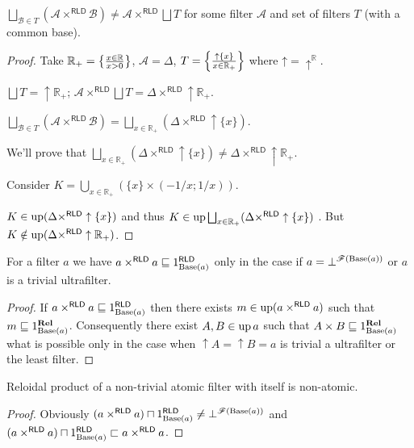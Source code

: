 \begin{example}
$\bigsqcup_{\mathcal{B}\in T}(\mathcal{A}\times^{\mathsf{RLD}}\mathcal{B})\ne\mathcal{A}\times^{\mathsf{RLD}}\bigsqcup T$
for some filter $\mathcal{A}$ and set of filters $T$ (with a common
base).\end{example}
\begin{proof}
Take $\mathbb{R}_{+}=\left\{ \frac{x\in\mathbb{R}}{x>0}\right\}$, $\mathcal{A}=\Delta$,
$T=\left\{ \frac{\uparrow\{x\}}{x\in\mathbb{R}_{+}}\right\}$ where $\mathord\uparrow=\mathord{\uparrow^{\mathbb{R}}}$.

$\bigsqcup T=\uparrow\mathbb{R}_{+}$; $\mathcal{A}\times^{\mathsf{RLD}}\bigsqcup T=\Delta\times^{\mathsf{RLD}}\uparrow\mathbb{R}_{+}$.

$\bigsqcup_{\mathcal{B}\in T}(\mathcal{A}\times^{\mathsf{RLD}}\mathcal{B})=\bigsqcup_{x\in\mathbb{R}_{+}}(\Delta\times^{\mathsf{RLD}}\uparrow\{x\})$.

We'll prove that $\bigsqcup_{x\in\mathbb{R}_{+}}(\Delta\times^{\mathsf{RLD}}\uparrow\{x\})\ne\Delta\times^{\mathsf{RLD}}\uparrow\mathbb{R}_{+}$.

Consider $K=\bigcup_{x\in\mathbb{R}_{+}}(\{x\}\times(-1/x;1/x))$.

$K\in\operatorname{up}(\Delta\times^{\mathsf{RLD}}\uparrow\{x\})$ and thus $K\in\operatorname{up}\bigsqcup_{x\in\mathbb{R}_{+}}(\Delta\times^{\mathsf{RLD}}\uparrow\{x\})$
. But $K\notin\operatorname{up}(\Delta\times^{\mathsf{RLD}}\uparrow\mathbb{R}_{+})$.\end{proof}
\begin{thm}
For a filter $a$ we have $a\times^{\mathsf{RLD}}a\sqsubseteq1_{\operatorname{Base}(a)}^{\mathsf{RLD}}$
only in the case if $a=\bot^{\mathscr{F}(\operatorname{Base}(a))}$ or $a$ is a
trivial ultrafilter.\end{thm}
\begin{proof}
If $a\times^{\mathsf{RLD}}a\sqsubseteq1_{\operatorname{Base}(a)}^{\mathsf{RLD}}$
then there exists $m\in\operatorname{up}(a\times^{\mathsf{RLD}}a)$ such that $m\sqsubseteq1_{\operatorname{Base}(a)}^{\mathbf{Rel}}$.
Consequently there exist $A,B\in\operatorname{up} a$ such that $A\times B\sqsubseteq1_{\operatorname{Base}(a)}^{\mathbf{Rel}}$
what is possible only in the case when $\uparrow A=\uparrow B=a$
is trivial a ultrafilter or the least filter.\end{proof}
\begin{cor}
Reloidal product of a non-trivial atomic filter with itself is non-atomic.\end{cor}
\begin{proof}
Obviously $(a\times^{\mathsf{RLD}}a)\sqcap1_{\operatorname{Base}(a)}^{\mathsf{RLD}}\ne\bot^{\mathscr{F}(\operatorname{Base}(a))}$
and $(a\times^{\mathsf{RLD}}a)\sqcap1_{\operatorname{Base}(a)}^{\mathsf{RLD}}\sqsubset a\times^{\mathsf{RLD}}a$.\end{proof}
